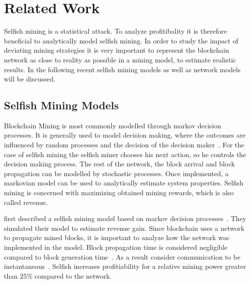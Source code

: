\chapter{Related Work}\label{chap:relatedwork}
Selfish mining is a statistical attack. To analyze profitibality it is therefore beneficial to analytically model selfish mining. In order to study the impact of deviating mining strategies it is very important to represent the blockchain network as close to reality as possible in a mining model, to estimate realistic results. In the following recent selfish mining models as well as network models will be discussed.


\section{Selfish Mining Models}
Blockchain Mining is most commonly modelled through markov decision processes.
It is generally used to model decision making, where the outcomes are influenced by random processes and the decision of the decision maker~\cite{ibe2013markov}.
For the case of selfish mining the selfish miner chooses his next action, so he controls the decision making process. The rest of the network, the block arrival and block propagation can be modelled by stochastic processes. Once implemented, a markovian model can be used to analytically estimate system properties. Selfish mining is concerned with maximizing obtained mining rewards, which is also called revenue.

\citeauthor{eyal} first described a selfish mining model based on markov decision processes~\cite{eyal}.
They simulated their model to estimate revenue gain. Since blockchain uses a network to propagate mined blocks, it is important to analyze how the network was implemented in the model. Block propagation time is considered negligible compared to block generation time~\cite{eyal}. As a result \citeauthor{eyal} consider communication to be instantaneous~\citep{eyal}. Selfish increases profitiability for a relative mining power greater than $25\%$ compared to the network.

